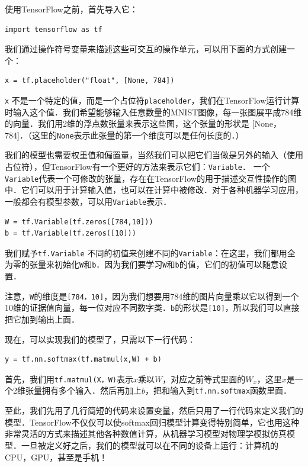 使用TensorFlow之前，首先导入它：
\begin{lstlisting}
import tensorflow as tf
\end{lstlisting}
我们通过操作符号变量来描述这些可交互的操作单元，可以用下面的方式创建一个：
\begin{lstlisting}
x = tf.placeholder("float", [None, 784])
\end{lstlisting}
\lstinline{x} 不是一个特定的值，而是一个占位符\lstinline{placeholder}，我们在TensorFlow运行计算时输入这个值．我们希望能够输入任意数量的MNIST图像，每一张图展平成784维的向量．我们用2维的浮点数张量来表示这些图，这个张量的形状是 [None，784]．（这里的\lstinline{None}表示此张量的第一个维度可以是任何长度的．）

我们的模型也需要权重值和偏置量，当然我们可以把它们当做是另外的输入（使用占位符），但TensorFlow有一个更好的方法来表示它们：\lstinline{Variable}． 一个\lstinline{Variable}代表一个可修改的张量，存在在TensorFlow的用于描述交互性操作的图中．它们可以用于计算输入值，也可以在计算中被修改．对于各种机器学习应用，一般都会有模型参数，可以用\lstinline{Variable}表示．

\begin{lstlisting}
W = tf.Variable(tf.zeros([784,10]))
b = tf.Variable(tf.zeros([10]))
\end{lstlisting}

我们赋予\lstinline{tf.Variable} 不同的初值来创建不同的\lstinline{Variable}：在这里，我们都用全为零的张量来初始化\lstinline{W}和\lstinline{b}．因为我们要学习\lstinline{W}和\lstinline{b}的值，它们的初值可以随意设置．

注意，\lstinline{W}的维度是\lstinline{[784，10]}，因为我们想要用784维的图片向量乘以它以得到一个10维的证据值向量，每一位对应不同数字类．\lstinline{b}的形状是\lstinline{[10]}，所以我们可以直接把它加到输出上面．

现在，可以实现我们的模型了，只需以下一行代码：

\begin{lstlisting}
y = tf.nn.softmax(tf.matmul(x,W) + b)
\end{lstlisting}

首先，我们用\lstinline{tf.matmul(X，W)}表示$x$乘以$W$，对应之前等式里面的$W_x$，这里$x$是一个2维张量拥有多个输入．然后再加上$b$，把和输入到\lstinline{tf.nn.softmax}函数里面．

至此，我们先用了几行简短的代码来设置变量，然后只用了一行代码来定义我们的模型．TensorFlow不仅仅可以使softmax回归模型计算变得特别简单，它也用这种非常灵活的方式来描述其他各种数值计算，从机器学习模型对物理学模拟仿真模型．一旦被定义好之后，我们的模型就可以在不同的设备上运行：计算机的CPU，GPU，甚至是手机！

